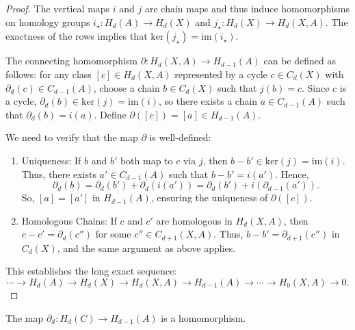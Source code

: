 \begin{proof}
The vertical maps $i$ and $j$ are chain maps and thus induce homomorphisms on homology groups $i_\star: H_d(A) \rightarrow H_d(X)$ and $j_\star: H_d(X) \rightarrow H_d(X,A)$. The exactness of the rows implies that $\mathrm{ker}(j_\star) = \mathrm{im}(i_\star)$.

The connecting homomorphism $\partial: H_d(X,A) \rightarrow H_{d-1}(A)$ can be defined as follows: for any class $[c] \in H_d(X,A)$ represented by a cycle $c \in C_d(X)$ with $\partial_d(c) \in C_{d-1}(A)$, choose a chain $b \in C_d(X)$ such that $j(b) = c$. Since $c$ is a cycle, $\partial_d(b) \in \mathrm{ker}(j) = \mathrm{im}(i)$, so there exists a chain $a \in C_{d-1}(A)$ such that $\partial_d(b) = i(a)$. Define $\partial([c]) = [a] \in H_{d-1}(A)$.

We need to verify that the map $\partial$ is well-defined:
\begin{enumerate}
	\item Uniqueness: If $b$ and $b'$ both map to $c$ via $j$, then $b - b' \in \mathrm{ker}(j) = \mathrm{im}(i)$. Thus, there exists $a' \in C_{d-1}(A)$ such that $b - b' = i(a')$. Hence,
	\[
	\partial_d(b) = \partial_d(b') + \partial_d(i(a')) = \partial_d(b') + i(\partial_{d-1}(a')).
	\]
	So, $[a] = [a']$ in $H_{d-1}(A)$, ensuring the uniqueness of $\partial([c])$.

	\item Homologous Chains: If $c$ and $c'$ are homologous in $H_d(X,A)$, then $c - c' = \partial_d(c'')$ for some $c'' \in C_{d+1}(X,A)$. Thus, $b - b' = \partial_{d+1}(c'')$ in $C_d(X)$, and the same argument as above applies.
\end{enumerate}

This establishes the long exact sequence:
\begin{equation*}
\cdots \rightarrow H_d(A) \rightarrow H_d(X) \rightarrow H_d(X,A) \rightarrow H_{d-1}(A) \rightarrow \cdots \rightarrow H_0(X,A) \rightarrow 0.
\end{equation*}
\end{proof}

\begin{proposition}
The map $\partial_d: H_d(C) \rightarrow H_{d-1}(A)$ is a homomorphism.
\end{proposition}

